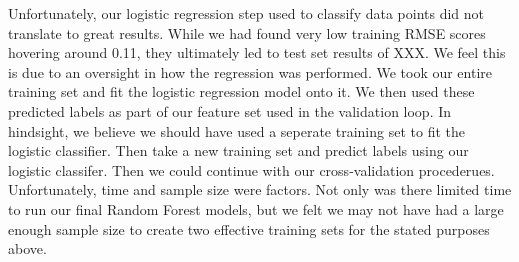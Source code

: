 \documentclass[11pt, oneside]{article}   	%
\begin{document}
Unfortunately, our logistic regression step used to classify data points did not translate to great results. While we had found very low training RMSE scores hovering around 0.11, they ultimately led to test set results of XXX. We feel this is due to an oversight in how the regression was performed. We took our entire training set and fit the logistic regression model onto it. We then used these predicted labels as part of our feature set used in the validation loop. In hindsight, we believe we should have used a seperate training set to fit the logistic classifier. Then take a new training set and predict labels using our logistic classifer. Then we could continue with our cross-validation procederues. Unfortunately, time and sample size were factors. Not only was there limited time to run our final Random Forest models, but we felt we may not have had a large enough sample size to create two effective training sets for the stated purposes above.



 
 
\end{document}
